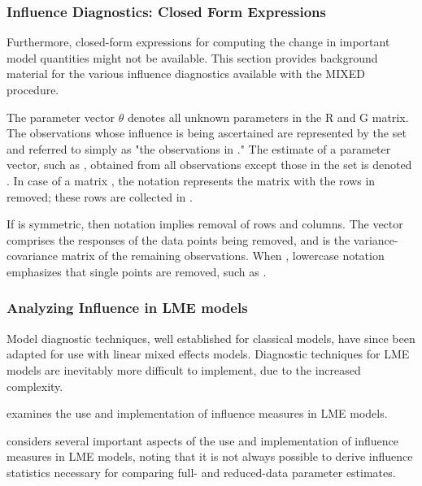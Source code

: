 \documentclass[12pt, a4paper]{report}
\theoremstyle{plain}
\theoremstyle{definition}
\theoremstyle{remark}
\begin{document}
	
	
	\subsubsection{Influence Diagnostics: Closed Form Expressions} %
	
	
	
	Furthermore, closed-form expressions for computing the change in important model quantities might not be available.
	This section provides background material for the various influence diagnostics available with the MIXED procedure. 
	
	The parameter vector $\theta$ denotes all unknown parameters in the  R and G  matrix.
	The observations whose influence is being ascertained are represented by the set  and referred to simply as "the observations in ." The estimate of a parameter vector, such as , obtained from all observations except those in the set  is denoted . In case of a matrix , the notation  represents the matrix with the rows in  removed; these rows are collected in . 
	
	If  is symmetric, then notation  implies removal of rows and columns. The vector  comprises the responses of the data points being removed, and  is the variance-covariance matrix of the remaining observations. When , lowercase notation emphasizes that single points are removed, such as .
	
	
	
	\subsubsection{Analyzing Influence in LME models}
	
	Model diagnostic techniques, well established for classical models, have since been adapted for use with linear mixed effects models. Diagnostic techniques for LME models are inevitably more difficult to implement, due to the increased complexity.
	
	
	\citet{schabenberger} examines the use and implementation of influence measures in LME models.
	
	
	
	
	\citet{schabenberger} considers several important aspects of the use and implementation of influence measures in LME models, noting that it is not always possible to
	derive influence statistics necessary for comparing full- and reduced-data parameter estimates. 
	
\end{document}
